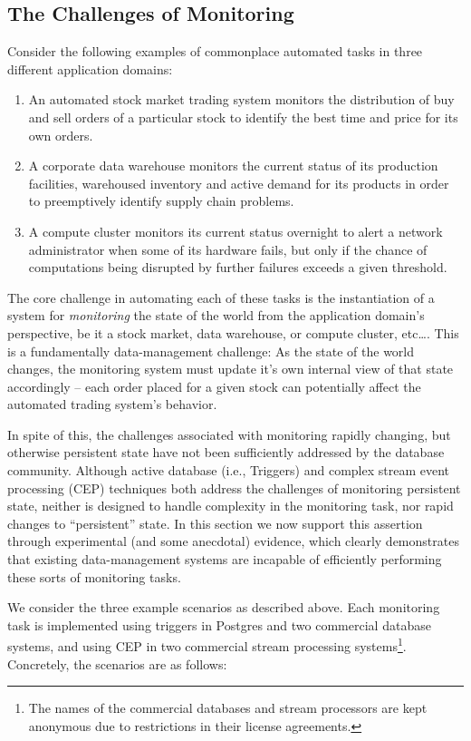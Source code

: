 \subsection{The Challenges of Monitoring}
Consider the following examples of commonplace automated tasks in three different application domains:
\begin{enumerate}
\item An automated stock market trading system monitors the distribution of buy and sell orders of a particular stock to identify the best time and price for its own orders.
\item A corporate data warehouse monitors the current status of its production facilities, warehoused inventory and active demand for its products in order to preemptively identify supply chain problems.
\item A compute cluster monitors its current status overnight to alert a network administrator when some of its hardware fails, but only if the chance of computations being disrupted by further failures exceeds a given threshold.
\end{enumerate}

The core challenge in automating each of these tasks is the instantiation of a system for {\em monitoring} the state of the world from the application domain's perspective, be it a stock market, data warehouse, or compute cluster, etc\ldots.  This is a fundamentally data-management challenge: As the state of the world changes, the monitoring system must update it's own internal view of that state accordingly -- each order placed for a given stock can potentially affect the automated trading system's behavior.  

In spite of this, the challenges associated with monitoring rapidly changing, but otherwise persistent state have not been sufficiently addressed by the database community. Although active database (i.e., Triggers)\cite{?} and complex stream event processing (CEP)\cite{?} techniques both address the challenges of monitoring persistent state, neither is designed to handle complexity in the monitoring task, nor rapid changes to ``persistent'' state.  In this section we now support this assertion through experimental (and some anecdotal) evidence, which clearly demonstrates that existing data-management systems are incapable of efficiently performing these sorts of monitoring tasks.

We consider the three example scenarios as described above.  Each monitoring task is implemented using triggers in Postgres and two commercial database systems, and using CEP in two commercial stream processing systems\footnote{The names of the commercial databases and stream processors are kept anonymous due to restrictions in their license agreements.}.  Concretely, the scenarios are as follows:

